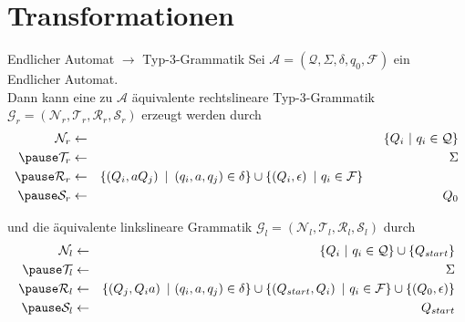 \documentclass[]{beamer}
\begin{document}
\section{Transformationen}
\begin{frame}[squeeze]{}
  \vspace*{-0.25em}
  \begin{block}{Endlicher Automat $\to$ Typ-3-Grammatik}
    Sei $\mathcal{A} = \left( \mathcal{Q}, \Sigma, \delta, q_0, \mathcal{F} \right)$ ein Endlicher Automat. \\
    \vspace*{0.5em}
    Dann kann eine zu $\mathcal{A}$ äquivalente rechtslineare Typ-3-Grammatik $\mathcal{G}_r = \left( \mathcal{N}_r, \mathcal{T}_r, \mathcal{R}_r, \mathcal{S}_r \right)$ erzeugt werden durch
    \pause
    \vspace*{-0.5em}
    \begin{eqnarray*}
      \mathcal{N}_r & \leftarrow & \left\{ Q_i \ | \ q_i \in \mathcal{Q} \right\} \\
      \pause
      \mathcal{T}_r & \leftarrow & \Sigma \\
      \pause
      \mathcal{R}_r & \leftarrow & \left\{ \left( Q_i, aQ_j \right) \ | \ \left( q_i, a, q_j \right) \in \delta \right\} \cup \left\{ \left( Q_i, \epsilon \right) \ | \ q_i \in \mathcal{F} \right\} \hspace*{7.5em} \\
      \pause
      \mathcal{S}_r & \leftarrow & Q_0 \\
    \end{eqnarray*}
      
    \pause
    \vspace*{-1em}
      
    und die äquivalente linkslineare Grammatik $\mathcal{G}_l = \left( \mathcal{N}_l, \mathcal{T}_l, \mathcal{R}_l, \mathcal{S}_l \right)$ durch
    \pause
    \vspace*{-0.5em}
    \begin{eqnarray*}
      \mathcal{N}_l & \leftarrow & \left\{ Q_i \ | \ q_i \in \mathcal{Q} \right\} \cup \left\{ Q_{start} \right\} \\
      \pause
      \mathcal{T}_l & \leftarrow & \Sigma \\
      \pause
      \mathcal{R}_l & \leftarrow & \left\{ \left( Q_j, Q_ia \right) \ | \ ( q_i, a, q_j ) \in \delta \right\} \cup \left\{ \left( Q_{start}, Q_i \right) \ | \ q_i \in \mathcal{F} \right\} \cup \left\{ \left( Q_0, \epsilon \right) \right\} \\
      \pause
      \mathcal{S}_l & \leftarrow & Q_{start} \\
    \end{eqnarray*}
    \vspace*{-3.5em}
  \end{block}
\end{frame}
\end{document}
